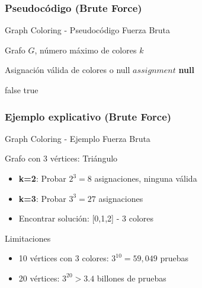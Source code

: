 \documentclass[aspectratio=169]{beamer}
\renewcommand{\algorithmicrequire}{\textbf{Entrada:}}
\renewcommand{\algorithmicensure}{\textbf{Salida:}}
\newcommand{\REQUIRE}{\item[\algorithmicrequire]}
\newcommand{\ENSURE}{\item[\algorithmicensure]}
\begin{document}
\subsubsection{Pseudocódigo (Brute Force)}
\begin{frame}[fragile]{Graph Coloring - Pseudocódigo Fuerza Bruta}
\begin{algorithmic}[1]
\REQUIRE Grafo $G$, número máximo de colores $k$
\ENSURE Asignación válida de colores o null
        \Return $assignment$
    \EndIf
\EndFor
\Return \textbf{null}
\end{algorithmic}

\begin{algorithmic}[1]
            \Return false
        \EndIf
    \EndFor
\EndFor
\Return true
\EndFunction
\end{algorithmic}
\end{frame}

\subsubsection{Ejemplo explicativo (Brute Force)}
\begin{frame}{Graph Coloring - Ejemplo Fuerza Bruta}
\begin{exampleblock}{Grafo con 3 vértices: Triángulo}
\begin{itemize}
\item \textbf{k=2}: Probar $2^3=8$ asignaciones, ninguna válida
\item \textbf{k=3}: Probar $3^3=27$ asignaciones
\item Encontrar solución: [0,1,2] - 3 colores
\end{itemize}
\end{exampleblock}

\begin{block}{Limitaciones}
\begin{itemize}
\item 10 vértices con 3 colores: $3^{10} = 59,049$ pruebas
\item 20 vértices: $3^{20} > 3.4$ billones de pruebas
\end{itemize}
\end{block}
\end{frame}
\end{document}
